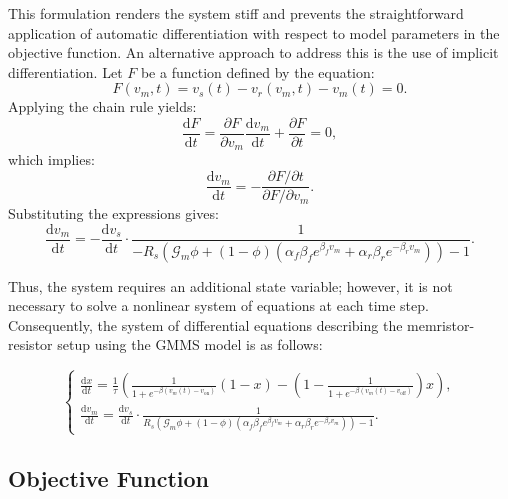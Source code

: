 \documentclass[11pt, oneside]{article}
\newcommand{\G}{\mathcal{G}}
\begin{document}
This formulation renders the system stiff and prevents the straightforward application of automatic differentiation with respect to model parameters in the objective function. An alternative approach to address this is the use of implicit differentiation.
Let $F$ be a function defined by the equation:
\begin{equation}
    F(v_m, t) = v_s(t) - v_r(v_m, t) - v_m(t) = 0.
\end{equation}
Applying the chain rule yields:
\begin{equation}
    \frac{\mathrm{d} F}{\mathrm{d} t} = \frac{\partial F}{\partial v_m} \frac{\mathrm{d} v_m}{\mathrm{d} t} + \frac{\partial F}{\partial t} = 0,
\end{equation}
which implies:
\begin{equation}
    \frac{\mathrm{d} v_m}{\mathrm{d} t} = - \frac{\partial F / \partial t}{\partial F / \partial v_m}.
\end{equation}
Substituting the expressions gives:
\begin{equation}
    \frac{\mathrm{d} v_m}{\mathrm{d} t} = - \frac{\mathrm{d} v_s}{\mathrm{d} t} \cdot \frac{1}{ - R_s \left( \G_{m} \phi + (1 - \phi) \left( \alpha_f \beta_f e^{\beta_f v_m} + \alpha_r \beta_r e^{-\beta_r v_m} \right) \right) - 1 }.
\end{equation}

Thus, the system requires an additional state variable; however, it is not necessary to solve a nonlinear system of equations at each time step. Consequently, the system of differential equations describing the memristor-resistor setup using the GMMS model is as follows:

\begin{equation}
    \begin{cases}
        \displaystyle \frac{\mathrm{d} x}{\mathrm{d} t} = \frac{1}{\tau} \left( \frac{1}{1 + e^{-\beta \left(v_m(t) - v_{\mathrm{on}}\right)}} (1 - x) - \left( 1 - \frac{1}{1 + e^{-\beta \left(v_m(t) - v_{\mathrm{off}}\right)}} \right) x \right), \\
        \displaystyle \frac{\mathrm{d} v_m}{\mathrm{d} t} = \frac{\mathrm{d} v_s}{\mathrm{d} t} \cdot \frac{1}{R_s \left( \G_{m} \phi + (1 - \phi) \left( \alpha_f \beta_f e^{\beta_f v_m} + \alpha_r \beta_r e^{-\beta_r v_m} \right) \right) - 1}.
    \end{cases}
\end{equation}


\subsection{Objective Function}
\end{document}
